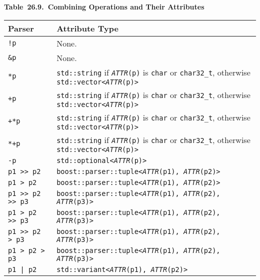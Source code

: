 \textbf{Table~26.9.~Combining Operations and Their Attributes}

\begin{longtable}[]{@{}ll@{}}
\toprule\noalign{}
Parser & Attribute Type \\
\midrule\noalign{}
\endhead
\bottomrule\noalign{}
\endlastfoot
\texttt{!p} & None. \\
\texttt{\&p} & None. \\
\texttt{*p} & \texttt{std::string} if \emph{\texttt{ATTR}}\texttt{(p)} is \texttt{char} or \texttt{char32\_t}, otherwise \texttt{std::vector<}\emph{\texttt{ATTR}}\texttt{(p)>} \\
\texttt{+p} & \texttt{std::string} if \emph{\texttt{ATTR}}\texttt{(p)} is \texttt{char} or \texttt{char32\_t}, otherwise \texttt{std::vector<}\emph{\texttt{ATTR}}\texttt{(p)>} \\
\texttt{+*p} & \texttt{std::string} if \emph{\texttt{ATTR}}\texttt{(p)} is \texttt{char} or \texttt{char32\_t}, otherwise \texttt{std::vector<}\emph{\texttt{ATTR}}\texttt{(p)>} \\
\texttt{*+p} & \texttt{std::string} if \emph{\texttt{ATTR}}\texttt{(p)} is \texttt{char} or \texttt{char32\_t}, otherwise \texttt{std::vector<}\emph{\texttt{ATTR}}\texttt{(p)>} \\
\texttt{-p} & \texttt{std::optional<}\emph{\texttt{ATTR}}\texttt{(p)>} \\
\texttt{p1 >> p2} & \texttt{boost::parser::tuple<}\emph{\texttt{ATTR}}\texttt{(p1), }\emph{\texttt{ATTR}}\texttt{(p2)>} \\
\texttt{p1 > p2} & \texttt{boost::parser::tuple<}\emph{\texttt{ATTR}}\texttt{(p1), }\emph{\texttt{ATTR}}\texttt{(p2)>} \\
\texttt{p1 >> p2 >> p3} & \texttt{boost::parser::tuple<}\emph{\texttt{ATTR}}\texttt{(p1), }\emph{\texttt{ATTR}}\texttt{(p2), }\emph{\texttt{ATTR}}\texttt{(p3)>} \\
\texttt{p1 > p2 >> p3} & \texttt{boost::parser::tuple<}\emph{\texttt{ATTR}}\texttt{(p1), }\emph{\texttt{ATTR}}\texttt{(p2), }\emph{\texttt{ATTR}}\texttt{(p3)>} \\
\texttt{p1 >> p2 > p3} & \texttt{boost::parser::tuple<}\emph{\texttt{ATTR}}\texttt{(p1), }\emph{\texttt{ATTR}}\texttt{(p2), }\emph{\texttt{ATTR}}\texttt{(p3)>} \\
\texttt{p1 > p2 > p3} & \texttt{boost::parser::tuple<}\emph{\texttt{ATTR}}\texttt{(p1), }\emph{\texttt{ATTR}}\texttt{(p2), }\emph{\texttt{ATTR}}\texttt{(p3)>} \\
\texttt{p1 | p2} & \texttt{std::variant<}\emph{\texttt{ATTR}}\texttt{(p1), }\emph{\texttt{ATTR}}\texttt{(p2)>} \\

\end{longtable}
